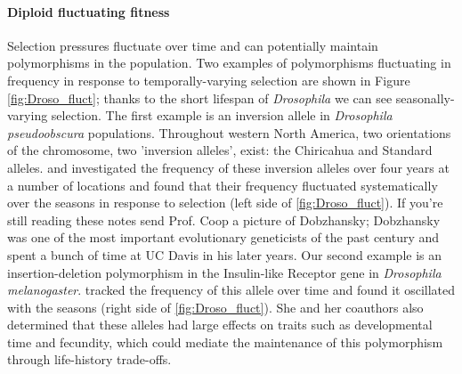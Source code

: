 \paragraph{Diploid fluctuating fitness}

Selection pressures fluctuate over time and can potentially maintain
polymorphisms in the population. Two examples of polymorphisms
fluctuating in frequency in response to temporally-varying selection are shown in Figure \ref{fig:Droso_fluct}; thanks to the short
lifespan of {\it Drosophila} we can see seasonally-varying
selection. The first example is an inversion allele in {\it Drosophila pseudoobscura} populations. Throughout western North America, two orientations of the
chromosome, two 'inversion alleles', exist: the Chiricahua and Standard
alleles. \citet{dobzhansky1943} and \citet{wright:46}
investigated the frequency of these inversion alleles over
four years at a number of locations and found that their frequency
fluctuated systematically over the seasons in response to
selection (left side of \ref{fig:Droso_fluct}). If you're still
reading these notes send Prof. Coop a picture of Dobzhansky;
Dobzhansky was one of the most important evolutionary geneticists of
the past century and spent a bunch of time at UC Davis in his later years. Our second example is an insertion-deletion polymorphism in
the Insulin-like Receptor gene in {\it Drosophila melanogaster}. \citet{paaby:14} tracked the
frequency of this allele over time and found it oscillated with the
seasons (right side of \ref{fig:Droso_fluct}). She and her coauthors
also determined that these alleles had large effects on traits such as
developmental time and fecundity, which could mediate the maintenance of this polymorphism through life-history trade-offs.

